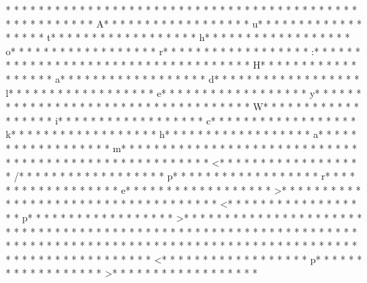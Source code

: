 * * *  * * *  * * *  *  * * *  *  * * *  * 	* * *  * * *  * * *  *  * * *  *  * * *  * 	* * *  * * *  * * *  *  * * *  *  * * *  * A* * *  * * *  * * *  *  * * *  *  * * *  * u* * *  * * *  * * *  *  * * *  *  * * *  * t* * *  * * *  * * *  *  * * *  *  * * *  * h* * *  * * *  * * *  *  * * *  *  * * *  * o* * *  * * *  * * *  *  * * *  *  * * *  * r* * *  * * *  * * *  *  * * *  *  * * *  * :* * *  * * *  * * *  *  * * *  *  * * *  *  * * *  * * *  * * *  *  * * *  *  * * *  * H* * *  * * *  * * *  *  * * *  *  * * *  * a* * *  * * *  * * *  *  * * *  *  * * *  * d* * *  * * *  * * *  *  * * *  *  * * *  * l* * *  * * *  * * *  *  * * *  *  * * *  * e* * *  * * *  * * *  *  * * *  *  * * *  * y* * *  * * *  * * *  *  * * *  *  * * *  *  * * *  * * *  * * *  *  * * *  *  * * *  * W* * *  * * *  * * *  *  * * *  *  * * *  * i* * *  * * *  * * *  *  * * *  *  * * *  * c* * *  * * *  * * *  *  * * *  *  * * *  * k* * *  * * *  * * *  *  * * *  *  * * *  * h* * *  * * *  * * *  *  * * *  *  * * *  * a* * *  * * *  * * *  *  * * *  *  * * *  * m* * *  * * *  * * *  *  * * *  *  * * *  * 
* * *  * * *  * * *  *  * * *  *  * * *  * 	* * *  * * *  * * *  *  * * *  *  * * *  * <* * *  * * *  * * *  *  * * *  *  * * *  * /* * *  * * *  * * *  *  * * *  *  * * *  * p* * *  * * *  * * *  *  * * *  *  * * *  * r* * *  * * *  * * *  *  * * *  *  * * *  * e* * *  * * *  * * *  *  * * *  *  * * *  * >* * *  * * *  * * *  *  * * *  *  * * *  * 
* * *  * * *  * * *  *  * * *  *  * * *  * <* * *  * * *  * * *  *  * * *  *  * * *  * p* * *  * * *  * * *  *  * * *  *  * * *  * >* * *  * * *  * * *  *  * * *  *  * * *  * 
* * *  * * *  * * *  *  * * *  *  * * *  * 	* * *  * * *  * * *  *  * * *  *  * * *  * 
* * *  * * *  * * *  *  * * *  *  * * *  * 	* * *  * * *  * * *  *  * * *  *  * * *  * 
* * *  * * *  * * *  *  * * *  *  * * *  * 	* * *  * * *  * * *  *  * * *  *  * * *  * <* * *  * * *  * * *  *  * * *  *  * * *  * p* * *  * * *  * * *  *  * * *  *  * * *  * >* * *  * * *  * * *  *  * * *  *  * * *  * 
